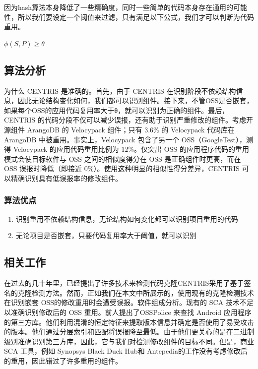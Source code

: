 \documentclass{cjc}
\begin{document}
因为hash算法本身降低了一些精确度，同时一些简单的代码本身存在通用的可能性，所以我们要设定一个阈值来过滤，只有满足以下公式，我们才可以判断为代码重用。



$\phi(S, P) \geq \theta$



\subsection{算法分析}
为什么 CENTRIS 是准确的。首先，由于 CENTRIS 在识别阶段不依赖结构信息，因此无论结构变化如何，我们都可以识别组件。接下来，不管OSS是否嵌套，如果每个OSS的应用代码复用率大于θ，就可以识别为正确的组件。最后，CENTRIS 的代码分段不仅可以减少误报，还有助于识别严重修改的组件。考虑开源组件 ArangoDB 的 Velocypack 组件；只有 3.6\% 的 Velocypack 代码库在 ArangoDB 中被重用。事实上，Velocypack 包含了另一个 OSS（GoogleTest），测得 Velocypack 的应用代码重用比例为 12\%。仅突出 OSS 的应用程序代码的重用模式会使目标软件与 OSS 之间的相似度得分在 OSS 是正确组件时更高，而在 OSS 误报时降低（即接近 0\%）。使用这种明显的相似性得分差异，CENTRIS 可以精确识别具有低误报率的修改组件。
\\
\subsubsection{算法优点}

\begin{enumerate}
    \item 识别重用不依赖结构信息，无论结构如何变化都可以识别项目重用的代码
    \item 无论项目是否嵌套，只要代码复用率大于阈值，就可以识别
\end{enumerate}

\subsection{相关工作}
在过去的几十年里，已经提出了许多技术来检测代码克隆CENTRIS采用了基于签名的克隆检测方法。然而，正如我们在本文中所展示的，使用现有的克隆检测技术在识别嵌套 OSS的修改重用时会遭受误报。软件组成分析。现有的 SCA 技术不足以准确识别修改后的 OSS 重用。前人提出了OSSPolice 来查找 Android 应用程序的第三方库。他们利用混淆的恒定特征来提取版本信息并确定是否使用了易受攻击的版本。他们通过分层索引和匹配将误报降至最低。由于他们更关心的是在二进制级别准确识别第三方库，因此，它与我们对检测修改组件的目标不同。但是，商业 SCA 工具，例如 Synopsys Black Duck Hub和 Antepedia的工作没有考虑修改后的重用，因此错过了许多重用的组件。
\end{document}
